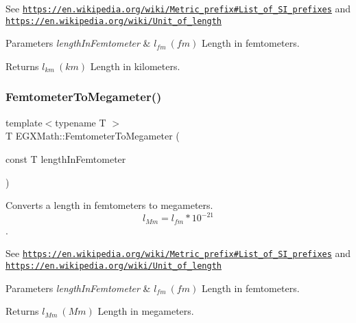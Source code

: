 See \href{https://en.wikipedia.org/wiki/Metric_prefix#List_of_SI_prefixes}{\tt https\+://en.\+wikipedia.\+org/wiki/\+Metric\+\_\+prefix\#\+List\+\_\+of\+\_\+\+S\+I\+\_\+prefixes} and \href{https://en.wikipedia.org/wiki/Unit_of_length}{\tt https\+://en.\+wikipedia.\+org/wiki/\+Unit\+\_\+of\+\_\+length} 
\begin{DoxyParams}{Parameters}
{\em length\+In\+Femtometer} & $ l_{fm}\ (fm)$ Length in femtometers. \\
\hline
\end{DoxyParams}
\begin{DoxyReturn}{Returns}
$ l_{km}\ (km)$ Length in kilometers. 
\end{DoxyReturn}
\mbox{\label{group___e_g_x_math-_conversions-_length_conversions-_s_i-_femtometer-_s_i_gac6c32f00b8dbf147521bdcfeb39b57f2}} 
\subsubsection{\texorpdfstring{Femtometer\+To\+Megameter()}{FemtometerToMegameter()}}
{\footnotesize\ttfamily template$<$typename T $>$ \\
T E\+G\+X\+Math\+::\+Femtometer\+To\+Megameter (\begin{DoxyParamCaption}\item[{const T}]{length\+In\+Femtometer }\end{DoxyParamCaption})}



Converts a length in femtometers to megameters. \[ l_{Mm}=l_{fm} * 10^{-21} \]. 

See \href{https://en.wikipedia.org/wiki/Metric_prefix#List_of_SI_prefixes}{\tt https\+://en.\+wikipedia.\+org/wiki/\+Metric\+\_\+prefix\#\+List\+\_\+of\+\_\+\+S\+I\+\_\+prefixes} and \href{https://en.wikipedia.org/wiki/Unit_of_length}{\tt https\+://en.\+wikipedia.\+org/wiki/\+Unit\+\_\+of\+\_\+length} 
\begin{DoxyParams}{Parameters}
{\em length\+In\+Femtometer} & $ l_{fm}\ (fm)$ Length in femtometers. \\
\hline
\end{DoxyParams}
\begin{DoxyReturn}{Returns}
$ l_{Mm}\ (Mm)$ Length in megameters. 
\end{DoxyReturn}
\mbox{\label{group___e_g_x_math-_conversions-_length_conversions-_s_i-_femtometer-_s_i_gad0ac4ef551ee703c8952fe04fbd90f78}} 
